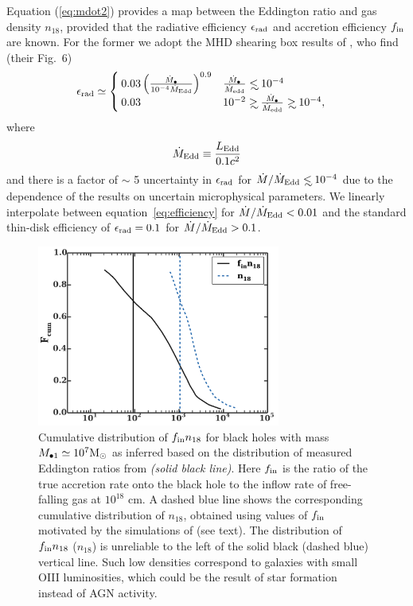 \documentclass[usenatbib,fleqn]{mnras}
\newcommand\lsim{\mathrel{\rlap{\lower4pt\hbox{\hskip1pt$\sim$}}
    \raise1pt\hbox{$<$}}}
\newcommand\gsim{\mathrel{\rlap{\lower4pt\hbox{\hskip1pt$\sim$}}
    \raise1pt\hbox{$>$}}}
\newcommand{\Mbh}[1][]{M_{\bullet1}}
\newcommand{\Msun}{{\rm M_\odot}}
\begin{document}
Equation (\ref{eq:mdot2}) provides a map between the Eddington ratio
and gas density $n_{18}$, provided that the radiative efficiency
$\epsilon_{\rm rad}$ and accretion efficiency $f_{\rm in}$ are known.
For the former we adopt the MHD shearing box results of
\citet{Sharma+2007}, who find (their Fig.~6)
\begin{align}
&\epsilon_{\rm rad} \simeq 
\begin{cases}
  0.03 \left(\frac{\dot{M}_{\bullet}}{10^{-4}\dot{M}_{\rm Edd}}\right)^{0.9} & \frac{\dot{M}_{\bullet}}{\dot{M}_{\rm edd}} \lsim 10^{-4} \\
 0.03 &  10^{-2} \gsim \frac{\dot{M}_{\bullet}}{\dot{M}_{\rm edd}}
 \gsim  10^{-4},
\end{cases}
\label{eq:efficiency}
\end{align}
where
\begin{equation} 
 \dot{M}_{\rm Edd} \equiv \frac{L_{\rm Edd}}{0.1 c^2} 
\end{equation}
%
and
there is a factor of $\sim$ 5 uncertainty in $\epsilon_{\rm rad}$ for
$\dot{M}/\dot{M}_{\rm Edd}\lsim 10^{-4}$ due to the dependence of the
results on uncertain microphysical parameters.  We linearly
interpolate between equation~\eqref{eq:efficiency} for
$\dot{M}/\dot{M}_{\rm Edd}<0.01$ and the standard thin-disk efficiency
of $\epsilon_{\rm rad}=0.1$ for $\dot{M}/\dot{M}_{\rm Edd}>0.1$.

\begin{figure}
\includegraphics[width=8cm]{fcum_n18.pdf}
\caption{\label{fig:n18Cum} Cumulative distribution of $f_{\rm in}
  n_{18}$ for black holes with mass $\Mbh\simeq 10^{7} \Msun$ as
  inferred based on the distribution of measured Eddington ratios from
  \citet{Kauffmann&Heckman2009} {\it (solid black line)}. Here $f_{\rm
    in}$ is the ratio of the true accretion rate onto the black hole
  to the inflow rate of free-falling gas at $10^{18}$ cm.  A dashed
  blue line shows the corresponding cumulative distribution of
  $n_{18}$, obtained using values of $f_{\rm in}$ motivated by the
  simulations of \citet{Li+2013} (see text). The distribution of
  $f_{\rm in} n_{18}$ ($n_{18}$) is unreliable to the left of the
  solid black (dashed blue) vertical line.  Such low densities
  correspond to galaxies with small OIII luminosities, which could be
  the result of star formation instead of AGN activity.}
\end{figure}
\end{document}
